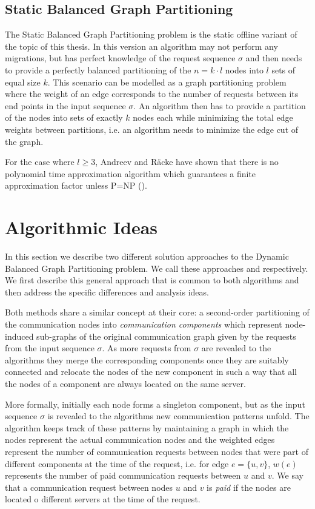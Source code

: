 \documentclass[a4paper,xcolor=dvipsnames, tikz, 12pt]{article}
\newcommand{\coreDel}{\text{C{\scriptsize ORE}-D{\scriptsize EL}}}
\newcommand{\adjDel}{\text{A{\scriptsize DJ}-D{\scriptsize EL}}}
\theoremstyle{definition}
\begin{document}
	
	\subsection{Static Balanced Graph Partitioning}
	The Static Balanced Graph Partitioning problem is the static offline variant of the topic of this thesis. In this version an algorithm may not perform any migrations, but has perfect knowledge of the request sequence $\sigma$ and then needs to provide a perfectly balanced partitioning of the $n=k\cdot l$ nodes into $l$ sets of equal size $k$. This scenario can be modelled as a graph partitioning problem where the weight of an edge corresponds to the number of requests between its end points in the input sequence $\sigma$. An algorithm then has to provide a partition of the nodes into sets of exactly $k$ nodes each while minimizing the total edge weights between partitions, i.e. an algorithm needs to minimize the edge cut of the graph. 
	
	For the case where $l\geq 3$, Andreev and R\"acke have shown that there is no polynomial time approximation algorithm which guarantees a finite approximation factor unless P=NP (\cite{Andreev2006}).
	
	
	\section{Algorithmic Ideas}
	\label{algIdeas}
	In this section we describe two different solution approaches to the Dynamic Balanced Graph Partitioning problem. We call these approaches \coreDel{} and \adjDel{} respectively. We first describe this general approach that is common to both algorithms and then address the specific differences and analysis ideas.
	
	Both methods share a similar concept at their core: a second-order partitioning of the communication nodes into \textit{communication components} which represent node-induced sub-graphs of the original communication graph given by the requests from the input sequence $\sigma$. As more requests from $\sigma$ are revealed to the algorithms they merge the corresponding components once they are suitably connected and relocate the nodes of the new component in such a way that all the nodes of a component are always located on the same server.
	
	More formally, initially each node forms a singleton component, but as the input sequence $\sigma$ is revealed to the algorithms new communication patterns unfold. The algorithm keeps track of these patterns by maintaining a graph in which the nodes represent the actual communication nodes and the weighted edges represent the number of communication requests between nodes that were part of different components at the time of the request, i.e. for edge $e=\{u,v\}$, $w(e)$ represents the number of paid communication requests between $u$ and $v$. We say that a communication request between nodes $u$ and $v$ is \textit{paid} if the nodes are located o different servers at the time of the request.
	
\end{document}
